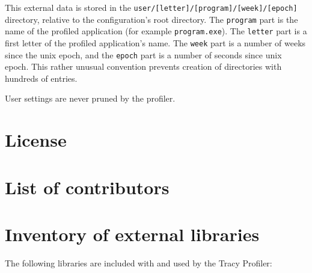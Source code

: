 \documentclass[hidelinks,titlepage,a4paper]{article}
\begin{document}
This external data is stored in the \texttt{user/[letter]/[program]/[week]/[epoch]} directory, relative to the configuration's root directory. The \texttt{program} part is the name of the profiled application (for example \texttt{program.exe}). The \texttt{letter} part is a first letter of the profiled application's name. The \texttt{week} part is a number of weeks since the unix epoch, and the \texttt{epoch} part is a number of seconds since unix epoch. This rather unusual convention prevents creation of directories with hundreds of entries.

User settings are never pruned by the profiler.

\newpage
\appendix
\appendixpage

\section{License}



\section{List of contributors}



\section{Inventory of external libraries}

The following libraries are included with and used by the Tracy Profiler:
\end{document}
